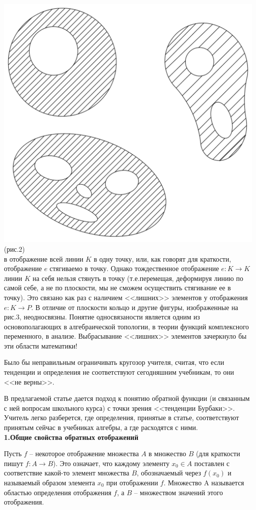 \documentclass{article}
\begin{document}
\includegraphics[scale=0.2]{faces.png}(рис.2)
\\в отображение всей линии $K$ в одну точку, или, как говорят для краткости, отображение $e$ стягиваемо в точку. Однако тождественное отображение $e:K\to K$ линии $K$ на себя нельзя стянуть в точку (т.е.перемещая, деформируя линию по самой себе, а не по плоскости, мы не сможем осуществить стягивание ее в точку). Это связано как раз с наличием <<лишних>> элементов у отображения $e:K\to P$. В отличие от плоскости кольцо и другие фигуры, изображенные на рис.3, неодносвязны. Понятие односвязаности является одним из основополагающих в алгебраической топологии, в теории функций комплексного переменного, в анализе. Выбрасывание <<лишних>> элементов зачеркнуло бы эти области математики!
\par Было бы неправильным ограничивать кругозор учителя, считая, что если тенденции и определения не соответствуют сегодняшним учебникам, то они <<не верны>>.
\par В предлагаемой статье дается подход к понятию обратной функции (и связанным с ней вопросам школьного курса) с точки зрения <<тенденции Бурбаки>>. Учитель легко разберется, где определения, принятые в статье, соответствуют принятым сейчас в учебниках алгебры, а где расходятся с ними.
\\\textbf{1.Общие свойства обратных отображений}
\par Пусть $f$ -- некоторое отображение множества $A$ в множество $B$ (для краткости пишут $f\colon A\to B$). Это означает, что каждому элементу $x_0\in A$ поставлен с соответствие какой-то элемент множества $B$, обозначаемый через $f(x_0)$ и называемый образом элемента $x_0$ при отображении $f$. Множество A называется областью определения отображения $f$, а $B$ -- множеством значений этого отображения.
\end{document}
